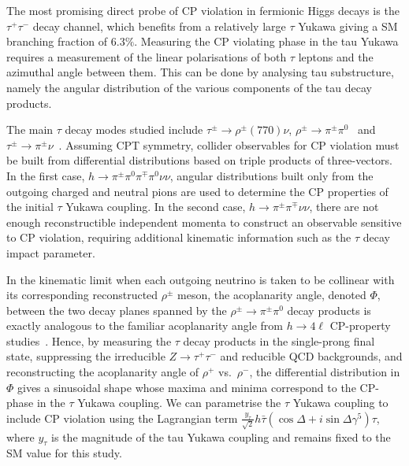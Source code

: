 
The most promising direct probe of CP violation in fermionic Higgs
decays is the $\tau^+ \tau^-$ decay channel, which benefits from a
relatively large $\tau$ Yukawa giving a SM branching fraction of
$6.3\%$. Measuring the CP violating phase in the tau Yukawa requires a measurement of the linear polarisations of both $\tau$ leptons and the azimuthal angle between them. This can be done by analysing tau substructure, namely the angular distribution of the various components of the tau decay products.

The main $\tau$ decay modes studied include $\tau^\pm \to
\rho^\pm (770) \nu$, $\rho^\pm \to \pi^\pm \pi^0$~\cite{Bower:2002zx,
  Desch:2003mw, Desch:2003rw, Harnik:2013aja, Askew:2015mda,
  Jozefowicz:2016kvz} and $\tau^\pm \to \pi^\pm
\nu$~\cite{Berge:2008wi, Berge:2008dr, Berge:2011ij}.  Assuming CPT
symmetry, collider observables for CP violation must be built from
differential distributions based on triple products of three-vectors.
In the first case, $h \to \pi^\pm \pi^0 \pi^\mp \pi^0 \nu \nu$,
angular distributions built only from the outgoing charged and neutral
pions are used to determine the CP properties of the initial $\tau$
Yukawa coupling.  In the second case, $h \to \pi^\pm \pi^\mp \nu \nu$,
there are not enough reconstructible independent momenta to construct an observable sensitive to CP violation, requiring additional kinematic information such as the $\tau$ decay impact parameter.

In the kinematic limit when each outgoing neutrino is taken to be
collinear with its corresponding reconstructed $\rho^\pm$ meson, the
acoplanarity angle, denoted $\Phi$, between the two decay planes
spanned by the $\rho^\pm \to \pi^\pm \pi^0$ decay products is exactly
analogous to the familiar acoplanarity angle from $h \to 4 \ell$
CP-property studies~\cite{Chatrchyan:2012jja, Aad:2013xqa}.  Hence, by measuring the $\tau$ decay products in
the single-prong final state, suppressing the irreducible $Z \to
\tau^+ \tau^-$ and reducible QCD backgrounds, and reconstructing the
acoplanarity angle of $\rho^+$ vs.~$\rho^-$, the differential
distribution in $\Phi$ gives a sinusoidal shape whose maxima and
minima correspond to the CP-phase in the $\tau$ Yukawa coupling.  We can parametrise the $\tau$ Yukawa coupling to include CP violation using the Lagrangian term $\frac{y_\tau}{\sqrt{2}} h \bar{\tau} (\cos \Delta + i \sin \Delta \gamma^5) \tau$, where $y_\tau$ is the magnitude of the tau Yukawa coupling and remains fixed to the SM value for this study.

